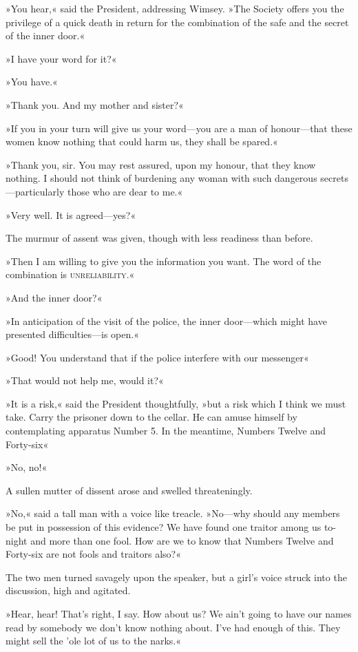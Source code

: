 »You hear,« said the President, addressing Wimsey. »The Society offers you the privilege of a quick death in return for the combination of the safe and the secret of the inner door.«

»I have your word for it?«

»You have.«

»Thank you. And my mother and sister?«

»If you in your turn will give us your word—you are a man of honour—that these women know nothing that could harm us, they shall be spared.«

»Thank you, sir. You may rest assured, upon my honour, that they know nothing. I should not think of burdening any woman with such dangerous secrets—particularly those who are dear to me.«

»Very well. It is agreed—yes?«

The murmur of assent was given, though with less readiness than before.

»Then I am willing to give you the information you want. The word of the combination is \textsc{unreliability}.«

»And the inner door?«

»In anticipation of the visit of the police, the inner door—which might have presented difficulties—is open.«

»Good! You understand that if the police interfere with our messenger\longdash«

»That would not help me, would it?«

»It is a risk,« said the President thoughtfully, »but a risk which I think we must take. Carry the prisoner down to the cellar. He can amuse himself by contemplating apparatus Number 5. In the meantime, Numbers Twelve and Forty-six\longdash«

»No, no!«

A sullen mutter of dissent arose and swelled threateningly.

»No,« said a tall man with a voice like treacle. »No—why should any members be put in possession of this evidence? We have found one traitor among us to-night and more than one fool. How are we to know that Numbers Twelve and Forty-six are not fools and traitors also?«

The two men turned savagely upon the speaker, but a girl's voice struck into the discussion, high and agitated.

»Hear, hear! That's right, I say. How about us? We ain't going to have our names read by somebody we don't know nothing about. I've had enough of this. They might sell the 'ole lot of us to the narks.«


